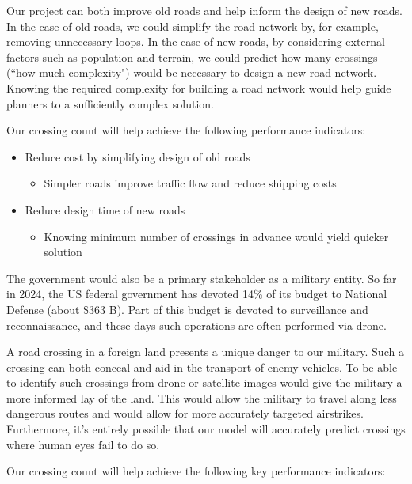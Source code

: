 \documentclass{article}
\begin{document}
	
	Our project can both improve old roads and help inform the design of new roads. In the case of old roads, we could simplify the road network by, for example, removing unnecessary loops. In the case of new roads, by considering external factors such as population and terrain, we could predict how many crossings (``how much complexity") would be necessary to design a new road network. Knowing the required complexity for building a road network would help guide planners to a sufficiently complex solution.
	
	Our crossing count will help achieve the following performance indicators:
	
	\begin{itemize}
		\item Reduce cost by simplifying design of old roads
		\begin{itemize}
			\item Simpler roads improve traffic flow and reduce shipping costs
			\end{itemize}
		\item Reduce design time of new roads
			\begin{itemize}
				\item Knowing minimum number of crossings in advance would yield quicker solution
			\end{itemize}
	\end{itemize}
	The government would also be a primary stakeholder as a military entity. So far in 2024, the US federal government has devoted 14\% of its budget to National Defense (about \$363 B). Part of this budget is devoted to surveillance and reconnaissance, and these days such operations are often performed via drone. 
	
	A road crossing in a foreign land presents a unique danger to our military. Such a crossing can both conceal and aid in the transport of enemy vehicles. To be able to identify such crossings from drone or satellite images would give the military a more informed lay of the land. This would allow the military to travel along less dangerous routes and would allow for more accurately targeted airstrikes. Furthermore, it's entirely possible that our model will accurately predict crossings where human eyes fail to do so. 
	
	Our crossing count will help achieve the following key performance indicators:
	
\end{document}
